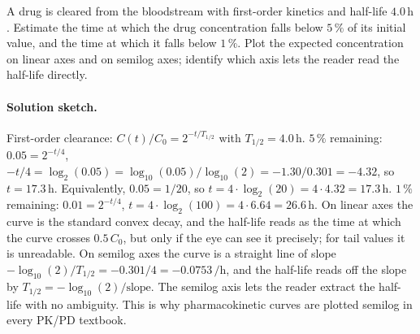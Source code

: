\begin{exercise}
A drug is cleared from the bloodstream with first-order kinetics and
half-life $4.0 \,\si{\hour}$. Estimate the time at which the drug
concentration falls below $5\,\%$ of its initial value, and the time
at which it falls below $1\,\%$. Plot the expected concentration on
linear axes and on semilog axes; identify which axis lets the reader
read the half-life directly.

\paragraph{Solution sketch.}
First-order clearance: $C(t)/C_{0} = 2^{-t/T_{1/2}}$ with
$T_{1/2} = 4.0\,\si{\hour}$.
$5\,\%$ remaining: $0.05 = 2^{-t/4}$, $-t/4 = \log_{2}(0.05) =
\log_{10}(0.05)/\log_{10}(2) = -1.30 / 0.301 = -4.32$, so $t =
17.3\,\si{\hour}$. Equivalently, $0.05 = 1/20$, so $t = 4 \cdot
\log_{2}(20) = 4 \cdot 4.32 = 17.3\,\si{\hour}$.
$1\,\%$ remaining: $0.01 = 2^{-t/4}$, $t = 4 \cdot \log_{2}(100)
= 4 \cdot 6.64 = 26.6\,\si{\hour}$.
On linear axes the curve is the standard convex decay, and the
half-life reads as the time at which the curve crosses $0.5\,C_{0}$,
but only if the eye can see it precisely; for tail values it is
unreadable. On semilog axes the curve is a straight line of slope
$-\log_{10}(2)/T_{1/2} = -0.301/4 = -0.0753\,\si{\per\hour}$, and
the half-life reads off the slope by $T_{1/2} = -\log_{10}(2)/
\text{slope}$. The semilog axis lets the reader extract the
half-life with no ambiguity. This is why pharmacokinetic curves are
plotted semilog in every PK/PD textbook.
\end{exercise}

